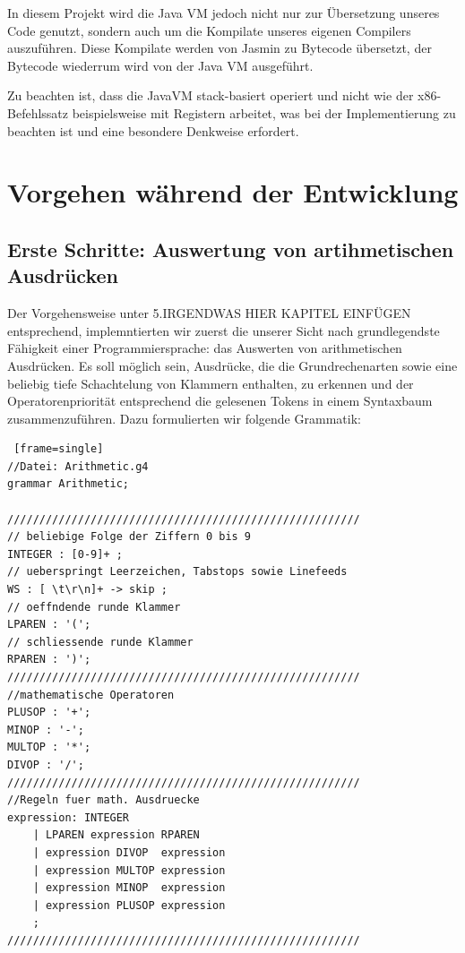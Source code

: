 \documentclass[12pt, a4paper, oneside, ngerman]{article}
\begin{document}
In diesem Projekt wird die Java VM jedoch nicht nur zur Übersetzung unseres Code genutzt, sondern auch um die Kompilate unseres eigenen Compilers auszuführen. Diese Kompilate werden von Jasmin zu Bytecode übersetzt, der Bytecode wiederrum wird von der Java VM ausgeführt.

Zu beachten ist, dass die JavaVM stack-basiert operiert und nicht wie der x86-Befehlssatz beispielsweise mit Registern arbeitet, was bei der Implementierung zu beachten ist und eine besondere Denkweise erfordert. 

\pagebreak
\section{Vorgehen während der Entwicklung}
\subsection{Erste Schritte: Auswertung von artihmetischen Ausdrücken}
Der Vorgehensweise unter 5.IRGENDWAS HIER KAPITEL EINFÜGEN entsprechend, implemntierten wir zuerst die unserer Sicht nach grundlegendste Fähigkeit einer Programmiersprache: das Auswerten von arithmetischen Ausdrücken. Es soll möglich sein, Ausdrücke, die die Grundrechenarten sowie eine beliebig tiefe Schachtelung von Klammern enthalten, zu erkennen und der Operatorenpriorität entsprechend die gelesenen Tokens in einem Syntaxbaum zusammenzuführen. Dazu formulierten wir folgende Grammatik:


\begin{lstlisting} [frame=single] 
//Datei: Arithmetic.g4
grammar Arithmetic;

///////////////////////////////////////////////////////
// beliebige Folge der Ziffern 0 bis 9
INTEGER : [0-9]+ ;        
// ueberspringt Leerzeichen, Tabstops sowie Linefeeds
WS : [ \t\r\n]+ -> skip ; 
// oeffndende runde Klammer
LPAREN : '(';		  	  
// schliessende runde Klammer
RPAREN : ')';		  	  
///////////////////////////////////////////////////////
//mathematische Operatoren
PLUSOP : '+';
MINOP : '-';
MULTOP : '*';
DIVOP : '/';
///////////////////////////////////////////////////////
//Regeln fuer math. Ausdruecke
expression: INTEGER					
	| LPAREN expression RPAREN		
	| expression DIVOP  expression  
	| expression MULTOP expression	
	| expression MINOP  expression 
	| expression PLUSOP expression 
	;			
///////////////////////////////////////////////////////

\end{lstlisting}
\end{document}
